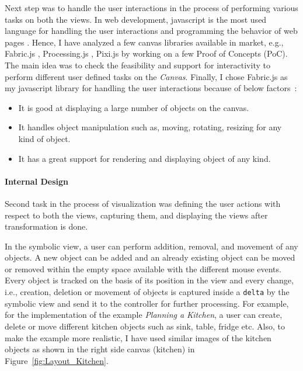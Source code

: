 Next step was to handle the user interactions in the process of performing various tasks on both the views. In web development, javascript is the most used language for handling the user interactions and programming the behavior of web pages \cite{javascript}. Hence, I have analyzed a few canvas libraries available in market, e.g., Fabric.js \cite{fabricjs}, Processing.js \cite{processingjs}, Pixi.js \cite{pixijs} by working on a few Proof of Concepts (PoC). The main idea was to check the feasibility and support for interactivity to perform different user defined tasks on the \textit{Canvas}. Finally, I chose Fabric.js as my javascript library for handling the user interactions because of below factors~\cite{fabricjs}:
\begin{itemize}
	\item {It is good at displaying a large number of objects on the canvas.}
	\item {It handles object manipulation such as, moving, rotating, resizing for any kind of object.}
	\item {It has a great support for rendering and displaying object of any kind.}
\end{itemize}

\paragraph{Internal Design}
Second task in the process of visualization was defining the user actions with respect to both the views, capturing them, and displaying the views after transformation is done.

In the symbolic view, a user can perform addition, removal, and movement of any objects. A new object can be added and an already existing object can be moved or removed within the empty space available with the different mouse events. Every object is tracked on the basis of its position in the view and every change, i.e., creation, deletion or movement of objects is captured inside a \texttt{delta} by the symbolic view and send it to the controller for further processing. For example, for the implementation of the example \textit{Planning a Kitchen}, a user can create, delete or move different kitchen objects such as sink, table, fridge etc. Also, to make the example more realistic, I have used similar images of the kitchen objects as shown in the right side canvas (kitchen) in Figure~\ref{fig:Layout_Kitchen}. 

